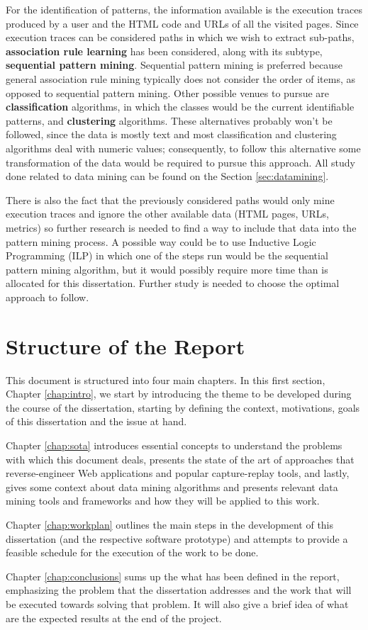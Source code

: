 For the identification of patterns, the information available is the execution traces produced by a user and the HTML code and URLs of all the visited pages. Since execution traces can be considered paths in which we wish to extract sub-paths, \textbf{association rule learning} has been considered, along with its subtype, \textbf{sequential pattern mining}. Sequential pattern mining is preferred because general association rule mining typically does not consider the order of items, as opposed to sequential pattern mining. Other possible venues to pursue are \textbf{classification} algorithms, in which the classes would be the current identifiable patterns, and \textbf{clustering} algorithms. These alternatives probably won't be followed, since the data is mostly text and most classification and clustering algorithms deal with numeric values; consequently, to follow this alternative some transformation of the data would be required to pursue this approach. All study done related to data mining can be found on the Section \ref{sec:datamining}. 

There is also the fact that the previously considered paths would only mine execution traces and ignore the other available data (HTML pages, URLs, metrics) so further research is needed to find a way to include that data into the pattern mining process. A possible way could be to use Inductive Logic Programming (ILP) in which one of the steps run would be the sequential pattern mining algorithm, but it would possibly require more time than is allocated for this dissertation. Further study is needed to choose the optimal approach to follow.

\section{Structure of the Report} \label{sec:outline}

This document is structured into four main chapters. In this first section, Chapter \ref{chap:intro}, we start by introducing the theme to be developed during the course of the dissertation, starting by defining the context, motivations, goals of this dissertation and the issue at hand.

Chapter \ref{chap:sota} introduces essential concepts to understand the problems with which this document deals, presents the state of the art of approaches that reverse-engineer Web applications and popular capture-replay tools, and lastly, gives some context about data mining algorithms and presents relevant data mining tools and frameworks and how they will be applied to this work.

Chapter \ref{chap:workplan} outlines the main steps in the development of this dissertation (and the respective software prototype) and attempts to provide a feasible schedule for the execution of the work to be done.

Chapter \ref{chap:conclusions} sums up the what has been defined in the report, emphasizing the problem that the dissertation addresses and the work that will be executed towards solving that problem. It will also give a brief idea of what are the expected results at the end of the project.
